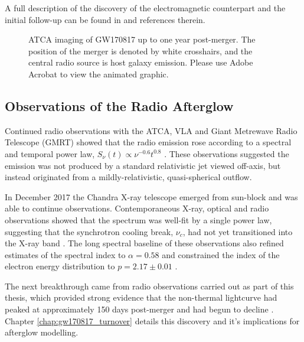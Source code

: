 A full description of the discovery of the electromagnetic counterpart and the initial follow-up can be found in \citet{2017ApJ...848L..12A} and references therein.


\begin{figure}
    \centering
    \caption[ATCA imaging of GW170817]{ATCA imaging of GW170817 up to one year post-merger. The position of the merger is denoted by white crosshairs, and the central radio source is host galaxy emission. Please use Adobe Acrobat to view the animated graphic.}
    \label{fig:gw170817_radio_imaging}
\end{figure}

\pagebreak
\subsection{Observations of the Radio Afterglow}
\label{subsec:gw170817_afterglow_observations}
Continued radio observations with the ATCA, VLA and Giant Metrewave Radio Telescope (GMRT) showed that the radio emission rose according to a spectral and temporal power law, $S_\nu(t) \propto \nu^{-0.6} t^{0.8}$ \citep{2018Natur.554..207M}. These observations suggested the emission was not produced by a standard relativistic jet viewed off-axis, but instead originated from a mildly-relativistic, quasi-spherical outflow.

In December 2017 the Chandra X-ray telescope emerged from sun-block and was able to continue observations. Contemporaneous X-ray, optical and radio observations showed that the spectrum was well-fit by a single power law, suggesting that the synchrotron cooling break, $\nu_c$, had not yet transitioned into the X-ray band \citep{2018MNRAS.478L..18T,2018ApJ...856L..18M}. The long spectral baseline of these observations also refined estimates of the spectral index to $\alpha=0.58$ and constrained the index of the electron energy distribution to $p=2.17\pm 0.01$ \citep{2018ApJ...856L..18M}.

The next breakthrough came from radio observations carried out as part of this thesis, which provided strong evidence that the non-thermal lightcurve had peaked at approximately 150 days post-merger and had begun to decline \citep{2018ApJ...858L..15D}. Chapter \ref{chap:gw170817_turnover} details this discovery and it's implications for afterglow modelling.

